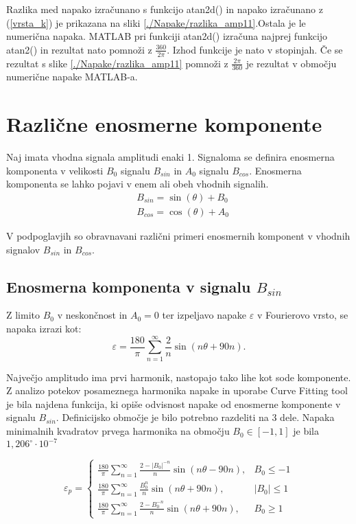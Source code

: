 Razlika med napako izračunano s funkcijo atan2d() in napako izračunano z (\ref{vrsta_k}) je prikazana na sliki \ref{./Napake/razlika_amp11}.Ostala je le numerična napaka. MATLAB pri funkciji atan2d() izračuna najprej funkcijo
atan2() in  rezultat nato pomnoži z $\frac{360}{2\pi}$. Izhod funkcije je nato v stopinjah. Če se rezultat s slike \ref{./Napake/razlika_amp11} pomnoži z $\frac{2\pi}{360}$ je rezultat v območju numerične napake MATLAB-a.
\newpage
\section{Različne enosmerne komponente}
Naj imata vhodna signala amplitudi enaki 1. Signaloma se definira enosmerna komponenta v velikosti $B_0$ signalu $B_{sin}$ in $A_0$ signalu $B_{cos}$. Enosmerna komponenta se lahko pojavi v enem ali obeh vhodnih signalih.
\begin{eqnarray}
\label{equ:def_sin_ama}
&B_{sin} = \sin(\theta) + B_0\\
\label{equ:def_cos_amp}
&B_{cos} =\cos(\theta) +A_0
\end{eqnarray}

V podpoglavjih so obravnavani različni primeri enosmernih komponent v vhodnih signalov $B_{sin}$ in $B_{cos}$.
\subsection{Enosmerna komponenta v signalu $B_{sin}$}

Z limito $B_0$ v neskončnost in $A_0 = 0$ ter izpeljavo napake $\varepsilon$ v Fourierovo vrsto, se napaka izrazi kot:
\begin{equation}
\varepsilon = \frac{180}{\pi}\sum_{n=1}^{\infty}\frac{2}{n} \sin (n \theta + 90 n).
\end{equation}

Največjo amplitudo ima prvi harmonik, nastopajo tako lihe kot sode komponente.
Z analizo potekov posameznega harmonika napake in uporabe Curve Fitting tool je bila najdena funkcija, ki opiše odvisnost napake od enosmerne komponente v signalu $B_{sin}$. Definicijsko območje je bilo potrebno
razdeliti na 3 dele. Napaka minimalnih kvadratov prvega harmonika na območju $B_0 \in [-1, 1]$ je bila $1,206^\circ \cdot 10^{-7} $

\begin{equation}
\label{vrsta_sinoff}
\varepsilon_p=
\begin{cases}
\frac{180}{\pi}\sum_{n=1}^{\infty}\frac{2-|B_0|^{-n}}{n} \sin (n \theta -  90 n), & B_0\leq -1 \\
\frac{180}{\pi}\sum_{n=1}^{\infty}\frac{B_0^n}{n} \sin (n \theta + 90 n), & |B_0|\leq 1 \\
\frac{180}{\pi}\sum_{n=1}^{\infty}\frac{2-B_0^{-n}}{n} \sin (n \theta + 90 n), & B_0\geq 1
\end{cases}
\end{equation}
\newpage
